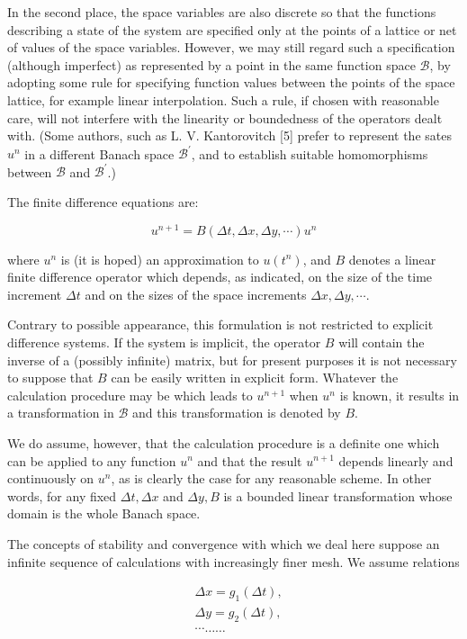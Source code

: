 \documentclass[10pt]{article}
\begin{document}
In the second place, the space variables are also discrete so that the functions describing a state of the system are specified only at the points of a lattice or net of values of the space variables. However, we may still regard such a specification (although imperfect) as represented by a point in the same function space \(\mathscr{B}\), by adopting some rule for specifying function values between the points of the space lattice, for example linear interpolation. Such a rule, if chosen with reasonable care, will not interfere with the linearity or boundedness of the operators dealt with. (Some authors, such as L. V. Kantorovitch [5] prefer to represent the sates \(u^{n}\) in a different Banach space \(\mathscr{B}^{\prime}\), and to establish suitable homomorphisms between \(\mathscr{B}\) and \(\mathscr{B}^{\prime}\).)

The finite difference equations are:

\[
u^{n+1}=B(\Delta t, \Delta x, \Delta y, \cdots) u^{n}
\]

where \(u^{n}\) is (it is hoped) an approximation to \(u\left(t^{n}\right)\), and \(B\) denotes a linear finite difference operator which depends, as indicated, on the size of the time increment \(\Delta t\) and on the sizes of the space increments \(\Delta x, \Delta y, \cdots\).

Contrary to possible appearance, this formulation is not restricted to explicit difference systems. If the system is implicit, the operator \(B\) will contain the inverse of a (possibly infinite) matrix, but for present purposes it is not necessary to suppose that \(B\) can be easily written in explicit form. Whatever the calculation procedure may be which leads to \(u^{n+1}\) when \(u^{n}\) is known, it results in a transformation in \(\mathscr{B}\) and this transformation is denoted by \(B\).

We do assume, however, that the calculation procedure is a definite one which can be applied to any function \(u^{n}\) and that the result \(u^{n+1}\) depends linearly and continuously on \(u^{n}\), as is clearly the case for any reasonable scheme. In other words, for any fixed \(\Delta t, \Delta x\) and \(\Delta y, B\) is a bounded linear transformation whose domain is the whole Banach space.

The concepts of stability and convergence with which we deal here suppose an infinite sequence of calculations with increasingly finer mesh. We assume relations

\[
\begin{aligned}
& \Delta x=g_{1}(\Delta t), \\
& \Delta y=g_{2}(\Delta t), \\
& \cdots \ldots \ldots
\end{aligned}
\]
\end{document}
